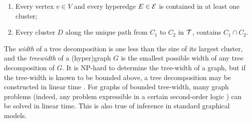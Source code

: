 \documentclass[twoside]{article}
\begin{document}
\begin{enumerate}[itemsep=0pt]
    \item Every vertex $v \in V$ and every hyperedge $E \in \mathcal E$ is contained in at least one cluster;
        \item Every cluster $D$ along the unique path from $C_1$ to $C_2$ in $\cal T$,
         contains $C_1 \cap C_2$.
\end{enumerate}

The \emph{width} of a tree decomposition is one less than the size of its largest cluster,
and the \emph{treewidth} of a (hyper)graph $G$ is the smallest possible width of any tree decomposition of $G$.
It is NP-hard to determine the tree-width of a graph, but if the tree-width is known to be bounded above, a tree decomposition may be constructed in linear time \parencite{bodlaender1993linear}.
For graphs of bounded tree-width, many graph problems 
(indeed, any problem expressible in a certain second-order logic \parencite{courcelle1990})
can be solved in
linear time.
This is also true of inference in standard graphical models.
\end{document}
